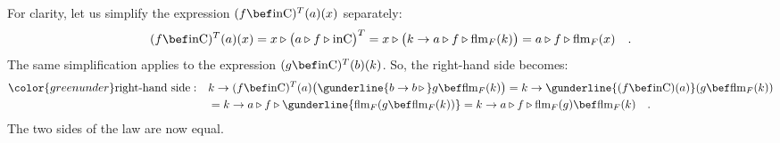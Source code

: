 For clarity, let us simplify the expression $(f\bef\text{inC})^{T}(a)(x)$
separately:
\[
(f\bef\text{inC})^{T}(a)(x)=x\triangleright\big(a\triangleright f\triangleright\text{inC}\big)^{T}=x\triangleright\big(k\rightarrow a\triangleright f\triangleright\text{flm}_{F}(k)\big)=a\triangleright f\triangleright\text{flm}_{F}(x)\quad.
\]
The same simplification applies to the expression $(g\bef\text{inC})^{T}(b)(k)$.
So, the right-hand side becomes:
\begin{align*}
{\color{greenunder}\text{right-hand side}:}\quad & k\rightarrow(f\bef\text{inC})^{T}(a)\big(\gunderline{b\rightarrow b\,\triangleright\,}g\bef\text{flm}_{F}(k)\big)=k\rightarrow\gunderline{(f\bef\text{inC})(a)}(g\bef\text{flm}_{F}(k))\\
 & =k\rightarrow a\triangleright f\triangleright\gunderline{\text{flm}_{F}(g\bef\text{flm}_{F}(k))}=k\rightarrow a\triangleright f\triangleright\text{flm}_{F}(g)\bef\text{flm}_{F}(k)\quad.
\end{align*}
The two sides of the law are now equal.

